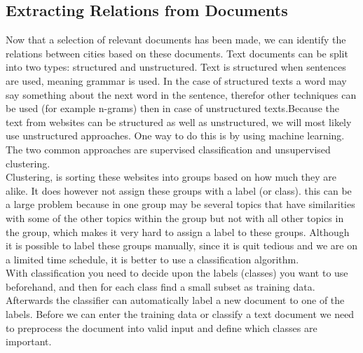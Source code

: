\subsection{Extracting Relations from Documents}
Now that a selection of relevant documents has been made, we can identify the relations between cities based on these documents. Text documents can be split into two types: structured and unstructured. Text is structured when sentences are used, meaning grammar is used. In the case of structured texts a word may say something about the next word in the sentence, therefor other techniques can be used (for example n-grams) then in case of unstructured texts.Because the text from websites can be structured as well as unstructured, we will most likely use unstructured approaches. One way to do this is by using machine learning. The two common approaches are supervised classification and unsupervised clustering. \\

Clustering, is sorting these websites into groups based on how much they are alike. It does however not assign these groups with a label (or class). this can be a large problem because in one group may be several topics that have similarities with some of the other topics within the group but not with all other topics in the group, which makes it very hard to assign a label to these groups. Although it is possible to label these groups manually, since it is quit tedious and we are on a limited time schedule, it is better to use a classification algorithm. \\

With classification you need to decide upon the labels (classes) you want to use beforehand, and then for each class find a small subset as training data. Afterwards the classifier can automatically label a new document to one of the labels. Before we can enter the training data or classify a text document we need to preprocess the document into valid input and define which classes are important.

